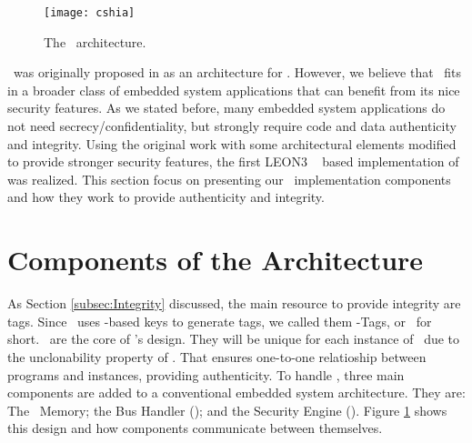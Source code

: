 

\begin{figure}[!ht]
	\centering
	\texttt{[image: cshia]}
	\caption{The \cshia~architecture.}
	\label{fig:cshia}
\end{figure}

\cshia~was originally proposed in \cite{Hoffman2015} as an architecture for \iot. However, we believe that \cshia~fits in a broader class of embedded system applications that can benefit from its nice security features. As we stated before, many embedded system applications do not need secrecy\slash{}confidentiality, but strongly require code and data authenticity and integrity. 
Using the original work with some architectural elements modified to provide stronger security features, the first LEON3 \fpga~ based implementation of \cshia was realized. This section focus on presenting our \cshia~implementation components and how they work to provide authenticity and integrity.

\section{Components of the Architecture}
\label{sec:Components-of-the-Architecture}

As Section \ref{subsec:Integrity} discussed, the main resource to provide integrity are tags. Since \cshia~uses \puf-based keys to generate tags, we called them \puf-Tags, or \ptags~for short. \ptags~are the core of \cshia's design. They will be unique for each instance of \cshia~due to the unclonability property of \pufs. That ensures one-to-one relatioship between programs and instances, providing authenticity. To handle \ptags, three main components are added to a conventional embedded system architecture. They are: The \ptag~Memory; the Bus Handler (\handler); and the Security Engine (\seceng). Figure \ref{fig:cshia} shows this design and how components communicate between themselves. 

